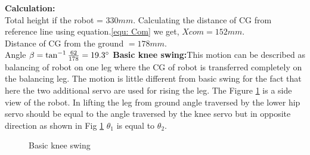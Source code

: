 \documentclass[12pt]{article}
\begin{document}
\newline
\textbf{Calculation:} \\
Total height if the robot = $330 mm $.
Calculating the distance of CG from reference line using equation.\eqref{equ: Com} we get, \newline
$Xcom =152 mm $.\\
Distance of CG from the ground $=178mm$.\\
Angle $\beta = \tan^{-1} \frac{62}{178} =19.3 \degree $
\newpage
\flushleft  \textbf{Basic knee swing:}This motion can be described as balancing of robot on one leg where
the CG of robot is transferred completely on the balancing leg. The motion is little
different from basic swing for the fact that here the two additional servo are used for rising
the leg. The Figure \ref{fig:p2motion1} is a side view of the robot. In lifting the leg from ground angle
traversed by the lower hip servo should be equal to the angle traversed by the knee servo
but in opposite direction as shown in Fig \ref{fig:p2motion1} $\theta_{1}$ is equal to $\theta_{2}$.\\
\begin{figure}[h!]
	
	\centering
	\hspace{2cm}
	\newline
	
	\caption{Basic knee swing}
	\label{fig:p2motion1}
\end{figure}
\end{document}
